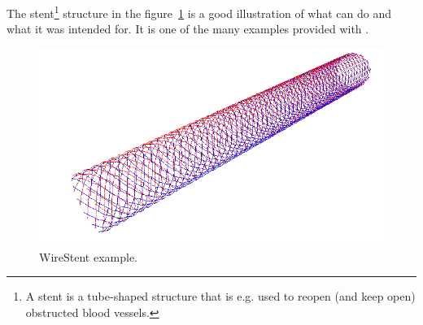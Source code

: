 The stent\footnote{A stent is a tube-shaped structure that is e.g. used to reopen (and keep open) obstructed blood vessels.} structure in the figure~\ref{fig:WireStent-example} is a good illustration of what \pyformex can do and what it was intended for. It is one of the many examples provided with \pyf.

\begin{figure}[h]
  \centering
  \begin{makeimage}
  \end{makeimage}
  \begin{latexonly}
    \includegraphics[width=12cm]{images/wirestent}
  \end{latexonly}
  \begin{htmlonly}
  \end{htmlonly}  
  \caption{WireStent example.}   \label{fig:WireStent-example}

\end{figure}

